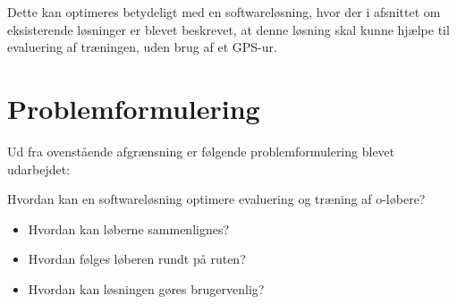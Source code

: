 Dette kan optimeres betydeligt med en softwareløsning, hvor der i afsnittet om eksisterende løsninger er blevet beskrevet, at denne løsning skal kunne hjælpe til evaluering af træningen, uden brug af et GPS-ur.

\section{Problemformulering}
Ud fra ovenstående afgrænsning er følgende problemformulering blevet udarbejdet:

Hvordan kan en softwareløsning optimere evaluering og træning af o-løbere?
\begin{itemize}
\item Hvordan kan løberne sammenlignes?
\item Hvordan følges løberen rundt på ruten?
\item Hvordan kan løsningen gøres brugervenlig?
\end{itemize}
